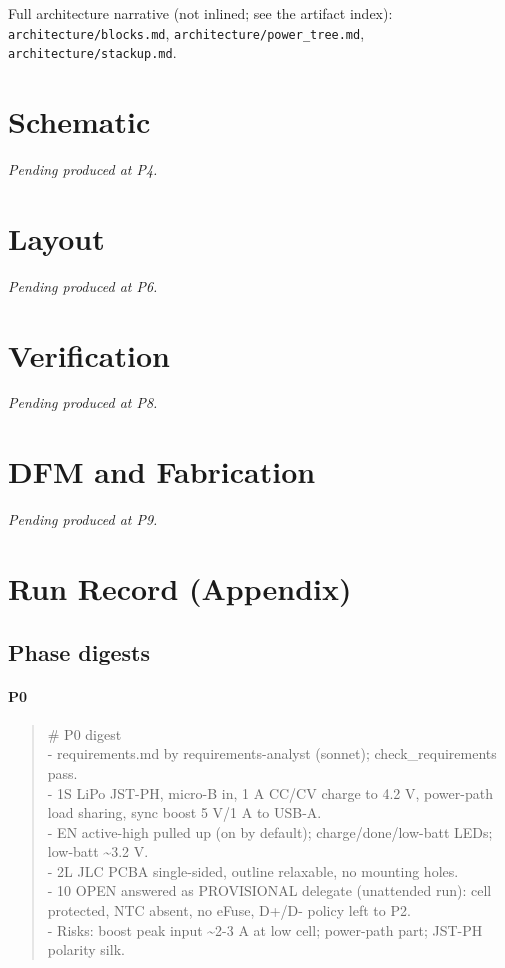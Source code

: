 \documentclass[11pt]{article}
\begin{document}
Full architecture narrative (not inlined; see the artifact index): \texttt{architecture/blocks.md}, \texttt{architecture/power\_tree.md}, \texttt{architecture/stackup.md}.
\section{Schematic}
\emph{Pending \textemdash{} produced at P4.}
\section{Layout}
\emph{Pending \textemdash{} produced at P6.}
\section{Verification}
\emph{Pending \textemdash{} produced at P8.}
\section{DFM and Fabrication}
\emph{Pending \textemdash{} produced at P9.}
\section{Run Record (Appendix)}
\subsection*{Phase digests}
\paragraph*{P0}
\begin{quote}\small\ttfamily\raggedright
\# P0 digest\\
- requirements.md by requirements-analyst (sonnet); check\_requirements pass.\\
- 1S LiPo JST-PH, micro-B in, 1 A CC/CV charge to 4.2 V, power-path load sharing, sync boost 5 V/1 A to USB-A.\\
- EN active-high pulled up (on by default); charge/done/low-batt LEDs; low-batt \textasciitilde{}3.2 V.\\
- 2L JLC PCBA single-sided, outline relaxable, no mounting holes.\\
- 10 OPEN answered as PROVISIONAL delegate (unattended run): cell protected, NTC absent, no eFuse, D+/D- policy left to P2.\\
- Risks: boost peak input \textasciitilde{}2-3 A at low cell; power-path part; JST-PH polarity silk.
\end{quote}
\end{document}
